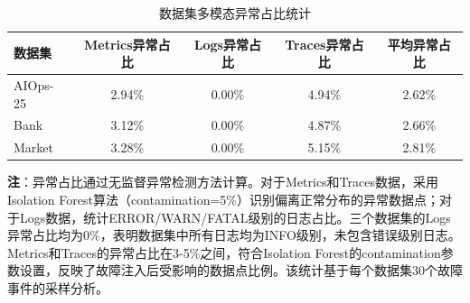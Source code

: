 \begin{table}[htbp]
\centering
\caption{数据集多模态异常占比统计}
\label{tab:anomaly_ratio_detected}
\small
\begin{tabular}{lcccc}
\toprule
\textbf{数据集} & \textbf{Metrics异常占比} & \textbf{Logs异常占比} & \textbf{Traces异常占比} & \textbf{平均异常占比} \\
\midrule
AIOps-25 & 2.94\% & 0.00\% & 4.94\% & 2.62\% \\
Bank     & 3.12\% & 0.00\% & 4.87\% & 2.66\% \\
Market   & 3.28\% & 0.00\% & 5.15\% & 2.81\% \\
\bottomrule
\end{tabular}
\end{table}

\textbf{注}：异常占比通过无监督异常检测方法计算。对于Metrics和Traces数据，采用Isolation Forest算法\cite{liu2008isolation}（contamination=5\%）识别偏离正常分布的异常数据点；对于Logs数据，统计ERROR/WARN/FATAL级别的日志占比。三个数据集的Logs异常占比均为0\%，表明数据集中所有日志均为INFO级别，未包含错误级别日志。Metrics和Traces的异常占比在3-5\%之间，符合Isolation Forest的contamination参数设置，反映了故障注入后受影响的数据点比例。该统计基于每个数据集30个故障事件的采样分析。
